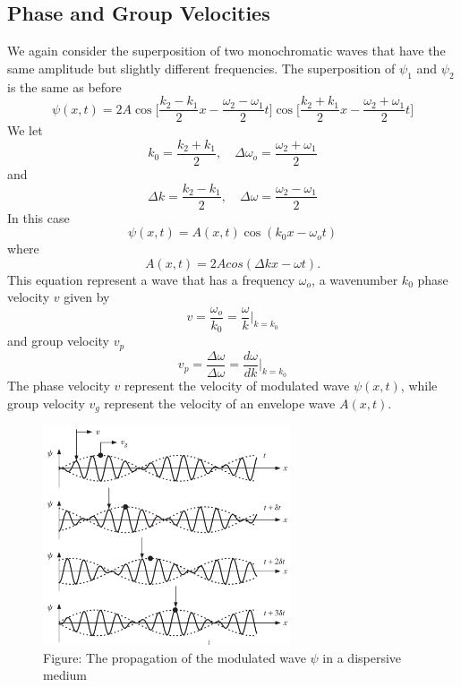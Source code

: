\documentclass[../../../main.tex]{subfiles}
\begin{document}
\subsection*{Phase and Group Velocities}
We again consider the superposition of two monochromatic waves that have the same amplitude but slightly different frequencies. The superposition of $\psi_1$ and $\psi_2$ is the same as before 
\begin{equation*}
    \psi(x,t)=2A\cos\bigg[\frac{k_2-k_1}{2}x-\frac{\omega_2-\omega_1}{2}t]\cos\bigg[\frac{k_2+k_1}{2}x-\frac{\omega_2+\omega_1}{2}t\bigg]
\end{equation*}
We let
\begin{equation*}
    k_0=\frac{k_2+k_1}{2},\quad      \Delta\omega_o=\frac{\omega_2+\omega_1}{2}
\end{equation*}
and
\begin{equation*}
    \Delta k=\frac{k_2-k_1}{2},\quad      \Delta\omega=\frac{\omega_2-\omega_1}{2}
\end{equation*}
In this case
\begin{equation*}
    \psi(x,t)=A(x, t) \cos(k_0x - \omega_ot) 
\end{equation*}
where 
\begin{equation*}
    A(x, t)=2A cos( \Delta k x- \omega t).
\end{equation*}
This equation represent a wave that has a frequency $\omega_o$, a wavenumber $k_0$ phase velocity $v$ given by
\begin{equation*}
      v=\frac{\omega_o}{k_0}=\frac{\omega}{k}\bigg|_{k=k_0}
\end{equation*}
and group velocity $v_p$
\begin{equation*}
    v_p=\frac{\Delta\omega}{\Delta\omega}=\frac{d\omega}{dk}\bigg|_{k=k_0}
\end{equation*}
The phase velocity $ v$ represent the velocity of modulated wave $\psi(x,t)$, while group velocity $v_g$ represent the velocity of an envelope wave $A(x,t)$. 

\begin{figure}
    \centering
    \includegraphics[width=0.65\textwidth]{../Rss/Waves/Dispersion/PhaseGroup.png}
    \caption*{Figure: The propagation of the modulated wave $\psi$ in a dispersive medium}
\end{figure}
\end{document}
